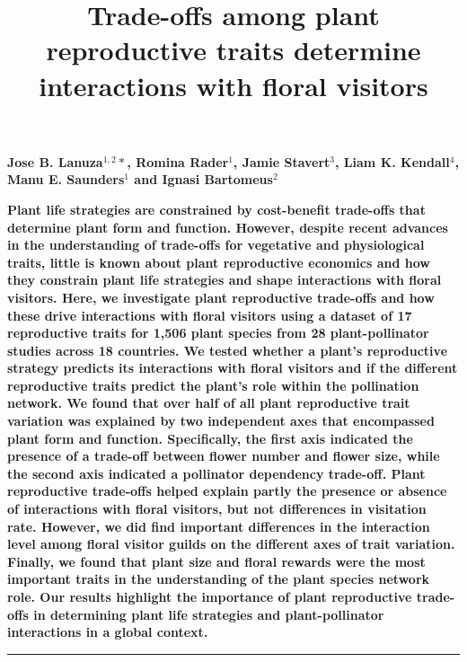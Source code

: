 \documentclass[
  12pt,
  a4paper,
]{article}
\title{\singlespacing \vspace{-1.6cm} \LARGE Trade-offs among plant reproductive traits determine interactions with floral visitors}
\author{}
\date{\vspace{-2.5em}}
\begin{document}
\maketitle

\vspace{-1.7cm}
\singlespacing
\large

\textbf{Jose B. Lanuza$^{1,2}*$, Romina Rader$^{1}$, Jamie Stavert$^{3}$, Liam K. Kendall$^{4}$, Manu E. Saunders$^{1}$ and Ignasi Bartomeus$^{2}$}

\vspace{0.3cm}

\normalsize

\textbf{Plant life strategies are constrained by cost-benefit trade-offs that determine plant form and function. However, despite recent advances in the understanding of trade-offs for vegetative and physiological traits, little is known about plant reproductive economics and how they constrain plant life strategies and shape interactions with floral visitors. Here, we investigate plant reproductive trade-offs and how these drive interactions with floral visitors using a dataset of 17 reproductive traits for 1,506 plant species from 28 plant-pollinator studies across 18 countries. We tested whether a plant's reproductive strategy predicts its interactions with floral visitors and if the different reproductive traits predict the plant's role within the pollination network. We found that over half of all plant reproductive trait variation was explained by two independent axes that encompassed plant form and function. Specifically, the first axis indicated the presence of a trade-off between flower number and flower size, while the second axis indicated a pollinator dependency trade-off. Plant reproductive trade-offs helped explain partly the presence or absence of interactions with floral visitors, but not differences in visitation rate. However, we did find important differences in the interaction level among floral visitor guilds on the different axes of trait variation. Finally, we found that plant size and floral rewards were the most important traits in the understanding of the plant species network role. Our results highlight the importance of plant reproductive trade-offs in determining plant life strategies and plant-pollinator interactions in a global context.}

\small
\vspace{-0.5cm}

\noindent

\rule{\textwidth}{1pt}
\end{document}
